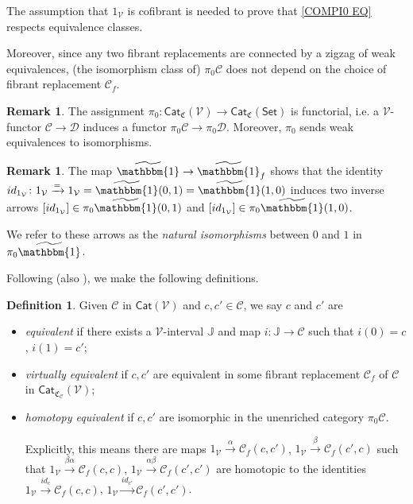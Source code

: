 \documentclass[a4paper,10pt
,draft
]{article}%
\numberwithin{equation}{section}
\numberwithin{figure}{section}
\theoremstyle{definition} %
\newtheorem{definition}[equation]{Definition}%
\newtheorem{remark}[equation]{Remark}%
\newcommand{\Cat}{\mathsf{Cat}}
\newcommand{\V}{\ensuremath{\mathcal V}}
\newcommand{\1}{\ensuremath{\mathbbm 1}}%
\begin{document}
The assumption that $1_{\mathcal{V}}$ is cofibrant
is needed to prove that \eqref{COMPI0 EQ}
respects equivalence classes. 

Moreover, since any two fibrant replacements are connected by a zigzag of weak equivalences,
(the isomorphism class of) $\pi_0 \mathcal{C}$ does not depend on the choice of fibrant replacement $\mathcal{C}_f$.



\begin{remark}
      The assignment
      $\pi_0\colon \mathsf{Cat}_{\mathfrak{C}}(\V)
\to \mathsf{Cat}_{\mathfrak{C}}(\mathsf{Set})$ is functorial,
i.e. a $\V$-functor
$\mathcal{C} \to \mathcal{D}$
induces a functor 
$\pi_0\mathcal{C} \to \pi_0\mathcal{D}$.
Moreover, $\pi_0$ sends weak equivalences to isomorphisms.
\end{remark}



\begin{remark}\label{NATISO REM}
The map $\widetilde{\mathbbm{1}} \to \widetilde{\mathbbm{1}}_f$
shows that the identity
$id_{1_{\V}}\colon 1_{\V} \xrightarrow{=} 1_{\V} = \widetilde{\mathbbm{1}}(0,1) = \widetilde{\mathbbm{1}}(1,0)$
induces two inverse arrows
$[id_{1_{\V}}] \in \pi_0 \widetilde{\mathbbm{1}}(0,1)$
and
$[id_{1_{\V}}] \in \pi_0 \widetilde{\mathbbm{1}}(1,0)$.

We refer to these arrows as the
\emph{natural isomorphisms} between $0$ and $1$ in $\pi_0 \widetilde{\mathbbm{1}}$.
\end{remark}




Following \cite[Def. 2.6]{BM13} (also \cite{Cav}),
we make the following definitions.

\begin{definition}\label{EQUIV_DEF}
	Given $\mathcal{C}$ in  $\Cat(\V)$ and $c,c'\in \mathcal C$, we say $c$ and $c'$ are
\begin{itemize}
	\item {\em equivalent} if there exists a $\V$-interval $\mathbb{J}$
	and map $i: \mathbb{J} \to \mathcal C$ such that
	$i(0)= c$, $i(1)= c'$;
	\item {\em virtually equivalent} if $c,c'$ are equivalent in some fibrant replacement
	$\mathcal C_f$ of $\mathcal C$ in $\Cat_{\mathfrak{C}_{\mathcal{C}}}(\V)$;
	\item {\em homotopy equivalent} if $c,c'$ are isomorphic in the unenriched category $\pi_0 \mathcal C$.

	Explicitly, this means there are maps 
	$1_\V \xrightarrow{\alpha} \mathcal C_f(c,c')$, 
	$1_\V \xrightarrow{\beta} \mathcal C_f(c',c)$ such that
	$1_{\V} \xrightarrow{\beta \alpha} \mathcal C_f(c,c)$,
	$1_{\V} \xrightarrow{\alpha \beta} \mathcal C_f(c',c')$
	are homotopic to the identities
	$1_{\V} \xrightarrow{id_c} \mathcal C_f(c,c)$,
	$1_{\V} \xrightarrow{id_{c'}} \mathcal C_f(c',c')$.
\end{itemize}
\end{definition}
\end{document}
